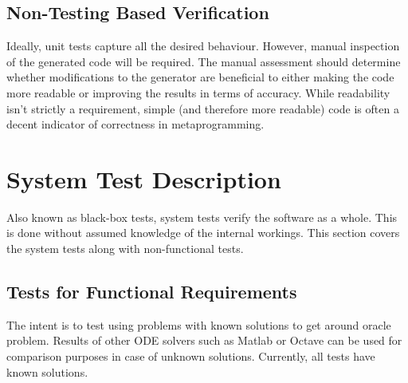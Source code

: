 \documentclass[12pt, titlepage]{article}
\begin{document}
\subsection{Non-Testing Based Verification}


Ideally, unit tests capture all the desired behaviour. However, manual 
inspection of the generated code will be required. The manual assessment should 
determine 
whether modifications to the generator are beneficial to either making the code 
more readable or improving the results in terms of accuracy.
While readability isn't strictly a requirement, simple (and therefore more 
readable) code is often a decent indicator of correctness in metaprogramming.


\section{System Test Description}

Also known as black-box tests, system tests verify the software as a whole. 
This is done without assumed knowledge of the internal workings.
This section covers the system tests along with non-functional tests.

\subsection{Tests for Functional Requirements}

The intent is to test using problems with known solutions to get around oracle 
problem.
Results of other ODE solvers such as Matlab or Octave can be used for 
comparison purposes in case of unknown solutions.
Currently, all tests have known solutions.  
\end{document}
